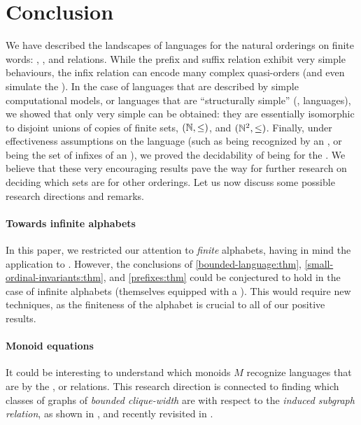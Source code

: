 \section{Conclusion}
\label{conclusion:sec}

We have described the landscapes of  languages for the
natural orderings on finite words: , , and 
relations. While the prefix and suffix relation exhibit very simple behaviours,
the infix relation can encode many complex quasi-orders (and even simulate the
). In the case of languages that are described by simple
computational models, or languages that are ``structurally simple''
(,  languages), we showed that only
very simple  can be obtained: they are essentially
isomorphic to disjoint unions of copies of finite sets, $(\mathbb{N}, \leq)$, and
$(\mathbb{N}^2, \leq)$. Finally, under effectiveness assumptions on the language
(such as being recognized by an , or being the set of
infixes of an ), we proved the decidability of being
 for the . We believe that these very
encouraging results pave the way for further research on deciding which sets
are  for other orderings. Let us now discuss
some possible research directions and remarks.

\paragraph*{Towards infinite alphabets} In this paper, we restricted our
attention to \emph{finite} alphabets, having in mind the application to
. However, the conclusions of
\cref{bounded-language:thm}, \cref{small-ordinal-invariants:thm}, and
\cref{prefixes:thm} could be conjectured to hold in the case of infinite
alphabets (themselves equipped with a ). This would
require new techniques, as the finiteness of the alphabet is crucial to all of
our positive results.

\paragraph*{Monoid equations}  It could be interesting to understand which
monoids $M$ recognize languages that are  by the
,  or  relations. This research direction is
connected to finding which classes of graphs of \emph{bounded clique-width} are
 with respect to the \emph{induced subgraph relation},
as shown in \cite{DRT10}, and recently revisited in \cite{lopez25}. 

